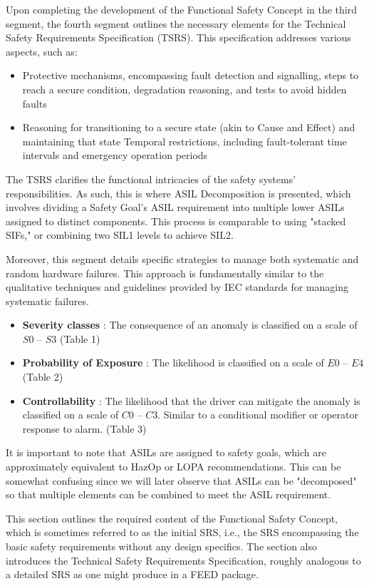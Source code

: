 \documentclass[./dissertation.tex]{subfiles}
\begin{document}
Upon completing the development of the Functional Safety Concept in the third segment, the fourth segment outlines the necessary elements for the Technical Safety Requirements Specification (TSRS). This specification addresses various aspects, such as:
\begin{itemize}
\item Protective mechanisms, encompassing fault detection and signalling, steps to reach a secure condition, degradation reasoning, and tests to avoid hidden faults
\item Reasoning for transitioning to a secure state (akin to Cause and Effect) and maintaining that state
Temporal restrictions, including fault-tolerant time intervals and emergency operation periods
\end{itemize}

The TSRS clarifies the functional intricacies of the safety systems' responsibilities. As such, this is where ASIL Decomposition is presented, which involves dividing a Safety Goal's ASIL requirement into multiple lower ASILs assigned to distinct components. This process is comparable to using "stacked SIFs," or combining two SIL1 levels to achieve SIL2.

Moreover, this segment details specific strategies to manage both systematic and random hardware failures. This approach is fundamentally similar to the qualitative techniques and guidelines provided by IEC standards for managing systematic failures.

\begin{itemize}
\item \textbf{Severity classes} : The consequence of an anomaly is classified on a scale of $S0$ – $S3$ (Table 1)
\item \textbf{Probability of Exposure} : The likelihood is classified on a scale of $E0$ – $E4$ (Table 2)
\item \textbf{Controllability} : The likelihood that the driver can mitigate the anomaly is classified on a scale of $C0$ – $C3$. Similar to a conditional modifier or operator response to alarm. (Table 3)
\end{itemize}

It is important to note that ASILs are assigned to safety goals, which are approximately equivalent to HazOp or LOPA recommendations. This can be somewhat confusing since we will later observe that ASILs can be "decomposed" so that multiple elements can be combined to meet the ASIL requirement.

This section outlines the required content of the Functional Safety Concept, which is sometimes referred to as the initial SRS, i.e., the SRS encompassing the basic safety requirements without any design specifics. The section also introduces the Technical Safety Requirements Specification, roughly analogous to a detailed SRS as one might produce in a FEED package.
\end{document}
